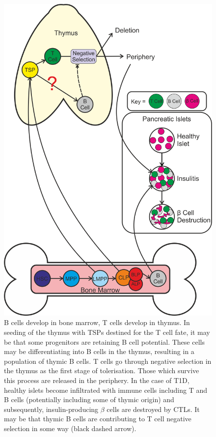 \begin{figure}
\includegraphics[width=\textwidth]{Figures/Introductorydiagram.png}
\caption[Diagrammatical overview of project]{B cells develop in bone marrow, T cells develop in thymus. 
In seeding of the thymus with TSPs destined for the T cell fate, it may be that some progenitors are retaining B cell potential.
These cells may be differentiating into B cells in the thymus, resulting in a population of thymic B cells.
T cells go through negative selection in the thymus as the first stage of tolerisation. 
Those which survive this process are released in the periphery.
In the case of T1D, healthy islets become infiltrated with immune cells including T and B cells (potentially including some of thymic origin) and subsequently, insulin-producing $\beta$ cells are destroyed by CTLs.
It may be that thymic B cells are contributing to T cell negative selection in some way (black dashed arrow).}
\label{fig:summarydiagram}
\end{figure}




































